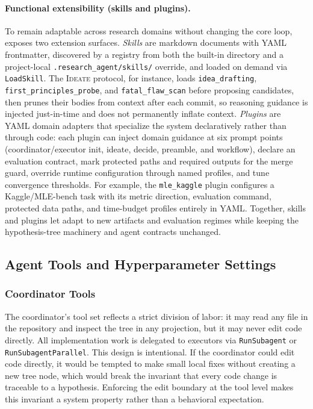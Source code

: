 \paragraph{Functional extensibility (skills and plugins).}
To remain adaptable across research domains without changing the core loop,
\arbor{} exposes two extension surfaces. \emph{Skills} are markdown documents
with YAML frontmatter, discovered by a registry from both the built-in directory
and a project-local \texttt{.research\_agent/skills/} override, and loaded on
demand via \texttt{LoadSkill}. The \textsc{Ideate} protocol, for instance, loads
\texttt{idea\_drafting}, \texttt{first\_principles\_probe}, and
\texttt{fatal\_flaw\_scan} before proposing candidates, then prunes their bodies
from context after each commit, so reasoning guidance is injected just-in-time
and does not permanently inflate context. \emph{Plugins} are YAML domain
adapters that specialize the system declaratively rather than through code: each
plugin can inject domain guidance at six prompt points (coordinator/executor
init, ideate, decide, preamble, and workflow), declare an evaluation contract,
mark protected paths and required outputs for the merge guard, override runtime
configuration through named profiles, and tune convergence thresholds. For
example, the \texttt{mle\_kaggle} plugin configures a Kaggle/MLE-bench task with
its metric direction, evaluation command, protected data paths, and time-budget
profiles entirely in YAML. Together, skills and plugins let \arbor{} adapt to new
artifacts and evaluation regimes while keeping the hypothesis-tree machinery and
agent contracts unchanged.

\subsection{Agent Tools and Hyperparameter Settings}
\label{app:agent-tools-params}

\subsubsection{Coordinator Tools}
\label{app:meta-agent-tools}

The coordinator's tool set reflects a strict division of labor: it may read
any file in the repository and inspect the tree in any projection, but it
may never edit code directly. All implementation work is delegated to
executors via \texttt{RunSubagent} or \texttt{RunSubagentParallel}. This
design is intentional. If the coordinator could edit code directly, it
would be tempted to make small local fixes without creating a new tree
node, which would break the invariant that every code change is traceable
to a hypothesis. Enforcing the edit boundary at the tool level makes this
invariant a system property rather than a behavioral expectation.

